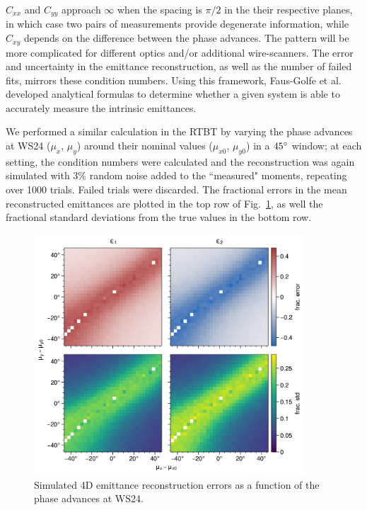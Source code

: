 %
$C_{xx}$ and $C_{yy}$ approach $\infty$ when the spacing is $\pi/2$ in the their respective planes, in which case two pairs of measurements provide degenerate information, while $C_{xy}$ depends on the difference between the phase advances. The pattern will be more complicated for different optics and/or additional wire-scanners. The error and uncertainty in the emittance reconstruction, as well as the number of failed fits, mirrors these condition numbers. Using this framework, Faus-Golfe et al. developed analytical formulas to determine whether a given system is able to accurately measure the intrinsic emittances.

We performed a similar calculation in the RTBT by varying the phase advances at WS24 ($\mu_x$, $\mu_y$) around their nominal values ($\mu_{x0}$, $\mu_{y0}$) in a $45\degree$ window; at each setting, the condition numbers were calculated and the reconstruction was again simulated with 3\% random noise added to the ``measured" moments, repeating over 1000 trials. Failed trials were discarded. The fractional errors in the mean reconstructed emittances are plotted in the top row of Fig.~\ref{fig:rtbt_montecarlo_emittances}, as well the fractional standard deviations from the true values in the bottom row. 
%
\begin{figure}[!p]
    \centering
    \includegraphics[width=0.9\textwidth]{Images/chapter4/rtbt_montecarlo_emittances.png}
    \caption{Simulated 4D emittance reconstruction errors as a function of the phase advances at WS24.}
    \label{fig:rtbt_montecarlo_emittances}
\end{figure}

